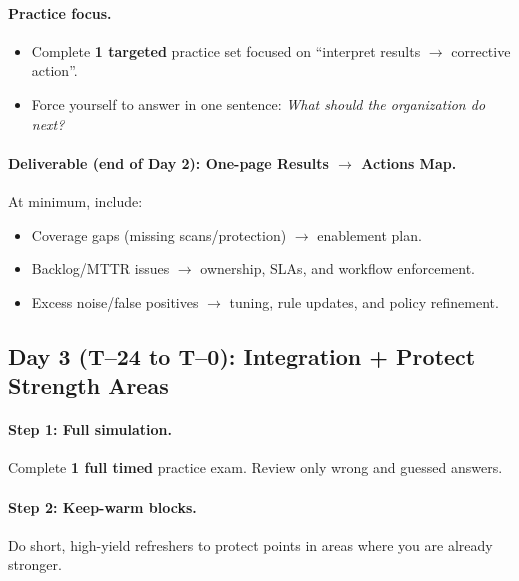 \documentclass[11pt]{article}
\begin{document}
\paragraph{Practice focus.}
\begin{itemize}
  \item Complete \textbf{1 targeted} practice set focused on ``interpret results $\rightarrow$ corrective action''.
  \item Force yourself to answer in one sentence: \emph{What should the organization do next?}
\end{itemize}

\paragraph{Deliverable (end of Day 2): One-page Results $\rightarrow$ Actions Map.}
At minimum, include:

\begin{itemize}
  \item Coverage gaps (missing scans/protection) $\rightarrow$ enablement plan.
  \item Backlog/MTTR issues $\rightarrow$ ownership, SLAs, and workflow enforcement.
  \item Excess noise/false positives $\rightarrow$ tuning, rule updates, and policy refinement.
\end{itemize}

\clearpage
\subsection*{Day 3 (T--24 to T--0): Integration + Protect Strength Areas}
\paragraph{Step 1: Full simulation.}
Complete \textbf{1 full timed} practice exam. Review only wrong and guessed answers.

\paragraph{Step 2: Keep-warm blocks.}
Do short, high-yield refreshers to protect points in areas where you are already stronger.
\end{document}
